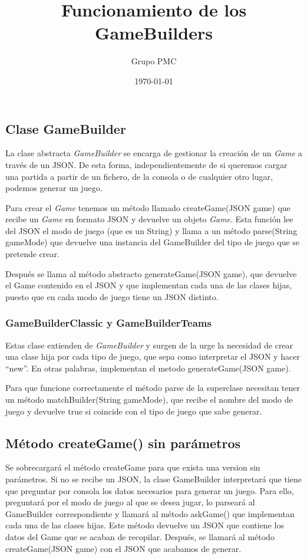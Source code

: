 \documentclass{article}
\title{Funcionamiento de los GameBuilders}
\date{\today}
\author{Grupo PMC}
\begin{document}
\maketitle
\subsection*{Clase GameBuilder}
La clase abstracta \textit{GameBuilder} se encarga de gestionar la creación de un \textit{Game} a través de un JSON. De esta forma, independientemente de si queremos cargar una partida a partir de un fichero, de la consola o de cualquier otro lugar, podemos generar un juego.

Para crear el \textit{Game} tenemos un  método llamado createGame(JSON game) que recibe un \textit{Game} en formato JSON y devuelve un objeto \textit{Game}. Esta función lee del JSON el modo de juego (que es un String) y llama a un método parse(String gameMode) que devuelve una instancia del GameBuilder del tipo de juego que se pretende crear.

Después se llama al método abstracto generateGame(JSON game), que devuelve el Game contenido en el JSON y que implementan cada una de las clases hijas, puesto que en cada modo de juego tiene un JSON distinto.

\subsubsection*{GameBuilderClassic y GameBuilderTeams}
Estas clase extienden de \textit{GameBuilder} y surgen de la urge la necesidad de crear una clase hija por cada tipo de juego, que sepa como interpretar el JSON y hacer ``new''. En otras palabras, implementan el metodo generateGame(JSON game).

Para que funcione correctamente el método parse de la superclase necesitan tener un método matchBuilder(String gameMode), que recibe el nombre del modo de juego y devuelve true si coincide con el tipo de juego que sabe generar.

\subsection*{Método createGame() sin parámetros}
Se sobrecargará el método createGame para que exista una version sin parámetros. Si no se recibe un JSON, la clase GameBuilder interpretará que tiene que preguntar por consola los datos necesarios para generar un juego. Para ello, preguntará por el modo de juego al que se desea jugar, lo parseará al GameBuilder correspondiente y llamará al método askGame() que implementan cada una de las clases hijas. Este método devuelve un JSON que contiene los datos del Game que se acaban de recopilar. Después, se llamará al método createGame(JSON game) con el JSON que acabamos de generar.
\end{document}
